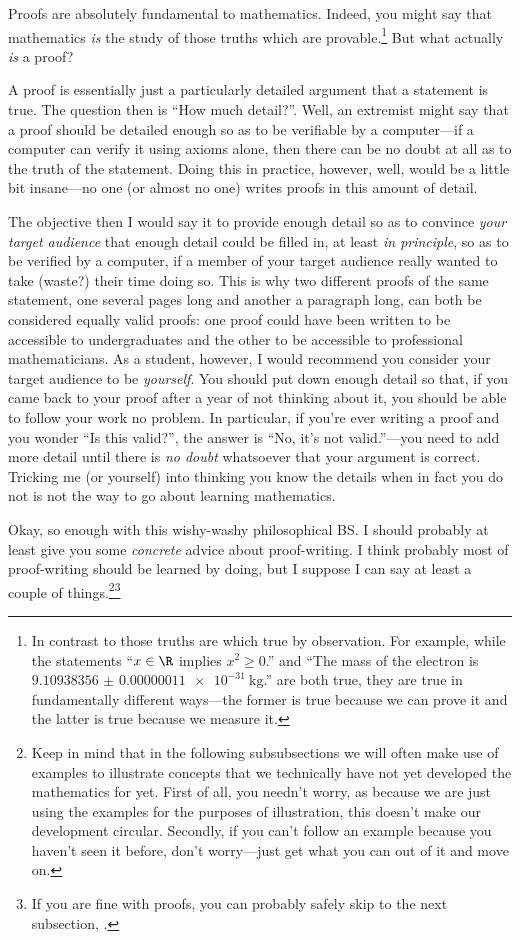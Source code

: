 Proofs are absolutely fundamental to mathematics.  Indeed, you might say that mathematics \emph{is} the study of those truths which are provable.\footnote{In contrast to those truths are which true by observation.  For example, while the statements ``$x\in \R$ implies $x^2\geq 0$.'' and ``The mass of the electron is $\SI{9.10938356(11)e-31}{\kilogram}$.'' are both true, they are true in fundamentally different ways---the former is true because we can prove it and the latter is true because we measure it.}  But what actually \emph{is} a proof?

A proof is essentially just a particularly detailed argument that a statement is true.  The question then is ``How much detail?''.  Well, an extremist might say that a proof should be detailed enough so as to be verifiable by a computer---if a computer can verify it using axioms alone, then there can be no doubt at all as to the truth of the statement.  Doing this in practice, however, well, would be a little bit insane---no one (or almost no one) writes proofs in this amount of detail.

The objective then I would say it to provide enough detail so as to convince \emph{your target audience} that enough detail could be filled in, at least \emph{in principle}, so as to be verified by a computer, if a member of your target audience really wanted to take (waste?) their time doing so.  This is why two different proofs of the same statement, one several pages long and another a paragraph long, can both be considered equally valid proofs:  one proof could have been written to be accessible to undergraduates and the other to be accessible to professional mathematicians.  As a student, however, I would recommend you consider your target audience to be \emph{yourself}.  You should put down enough detail so that, if you came back to your proof after a year of not thinking about it, you should be able to follow your work no problem.  In particular, if you're ever writing a proof and you wonder ``Is this valid?'', the answer is ``No, it's not valid.''---you need to add more detail until there is \emph{no doubt} whatsoever that your argument is correct.  Tricking me (or yourself) into thinking you know the details when in fact you do not is not the way to go about learning mathematics.

Okay, so enough with this wishy-washy philosophical BS.  I should probably at least give you some \emph{concrete} advice about proof-writing.  I think probably most of proof-writing should be learned by doing, but I suppose I can say at least a couple of things.\footnote{Keep in mind that in the following subsubsections we will often make use of examples to illustrate concepts that we technically have not yet developed the mathematics for yet.  First of all, you needn't worry, as because we are just using the examples for the purposes of illustration, this doesn't make our development circular.  Secondly, if you can't follow an example because you haven't seen it before, don't worry---just get what you can out of it and move on.}\footnote{If you are fine with proofs, you can probably safely skip to the next subsection, .}

